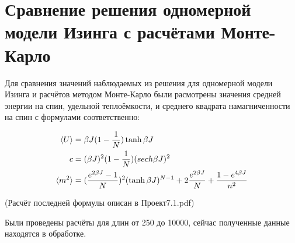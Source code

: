 \section{Сравнение решения одномерной модели Изинга с расчётами Монте-Карло}

Для сравнения значений наблюдаемых из решения для одномерной модели Изинга и расчётов методом Монте-Карло были расмотрены значения средней энергии на спин, удельной теплоёмкости, и среднего квадрата намагниченности на спин с формулами соответственно: 

\begin{align*}
    \langle U \rangle &= \beta J (1 - \frac{1}{N}) \tanh{\beta J} \\
    c &= (\beta J)^{2} (1 - \frac{1}{N}) (sech \beta J )^{2} \\
    \langle m^{2} \rangle &= (\frac{e^{2\beta J} - 1}{N})^{2} (\tanh{\beta J})^{N-1} + 2 \frac{e^{2\beta J}}{N} + \frac{1 - e^{4\beta J}}{n^2}
\end{align*}

(Расчёт последней формулы описан в Проект7.1.pdf\cite{Git})

Были проведены расчёты для длин от 250 до 10000, сейчас полученные данные находятся в обработке.